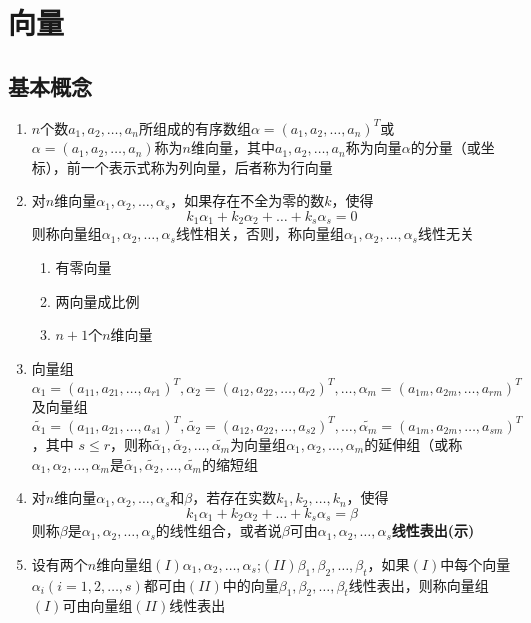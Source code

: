 \documentclass[a4paper,12pt]{article}
\begin{document}
    \section{向量}

    \subsection{基本概念}

    \begin{enumerate}
        \item $n$个数$a_1, a_2, \dots, a_n$所组成的有序数组$\alpha = (a_1, a_2, \dots, a_n)^T$或$\alpha = (a_1, a_2, \dots, a_n)$称为$n$维向量，其中$a_1, a_2, \dots, a_n$称为向量$\alpha$的分量（或坐标），前一个表示式称为列向量，后者称为行向量
        \item 对$n$维向量$\alpha_1, \alpha_2, \dots, \alpha_s$，如果存在不全为零的数$k$，使得
        \[
            k_{1}\alpha_1 + k_{2}\alpha_2 + \dots + k_{s}\alpha_s = 0
        \]
        则称向量组$\alpha_1, \alpha_2, \dots, \alpha_s$线性相关，否则，称向量组$\alpha_1, \alpha_2, \dots, \alpha_s$线性无关
        \begin{enumerate}
            \item 有零向量
            \item 两向量成比例
            \item $n+1$个$n$维向量
        \end{enumerate}
        \item 向量组$\alpha_1 = (a_{11}, a_{21}, \dots, a_{r1})^T, \alpha_2 = (a_{12}, a_{22}, \dots, a_{r2})^T, \dots, \alpha_m = (a_{1m}, a_{2m}, \dots, a_{rm})^T$及向量组$\widetilde{\alpha_1} = (a_{11}, a_{21}, \dots, a_{s1})^T, \widetilde{\alpha_2} = (a_{12}, a_{22}, \dots, a_{s2})^T, \dots, \widetilde{\alpha_m} = (a_{1m}, a_{2m}, \dots, a_{sm})^T$，其中 $s \le r$，则称$\widetilde{\alpha_1}, \widetilde{\alpha_2}, \dots, \widetilde{\alpha_m}$为向量组$\alpha_1, \alpha_2, \dots, \alpha_m$的延伸组（或称$\alpha_1, \alpha_2, \dots, \alpha_m$是$\widetilde{\alpha_1}, \widetilde{\alpha_2}, \dots, \widetilde{\alpha_m}$的缩短组
        \item 对$n$维向量$\alpha_1, \alpha_2, \dots, \alpha_s$和$\beta$，若存在实数$k_1, k_2, \dots, k_n$，使得
        \[
            k_{1}\alpha_1 + k_{2}\alpha_2 + \dots + k_{s}\alpha_s = \beta
        \]
        则称$\beta$是$\alpha_1, \alpha_2, \dots, \alpha_s$的线性组合，或者说$\beta$可由$\alpha_1, \alpha_2, \dots, \alpha_s$\textbf{线性表出(示)}
        \item 设有两个$n$维向量组$(I)\alpha_1, \alpha_2, \dots, \alpha_s$;$(II)\beta_1, \beta_2, \dots, \beta_t$，如果$(I)$中每个向量$\alpha_i(i = 1,2,\dots,s)$都可由$(II)$中的向量$\beta_1, \beta_2, \dots, \beta_t$线性表出，则称向量组$(I)$可由向量组$(II)$线性表出

\end{enumerate}
\end{document}

